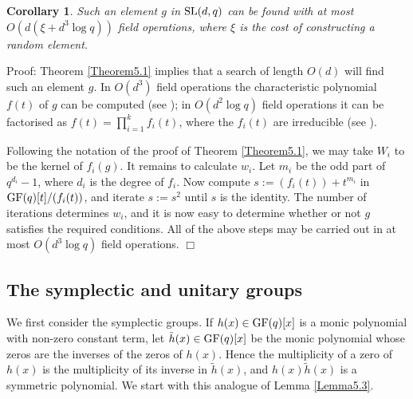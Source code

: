 \documentclass[12pt]{article}
\newtheorem{corollary}[definition]{Corollary}
\newenvironment{proof}{\normalsize {\sc Proof}:}{{\hfill $\Box$ \\}}
\def\SL{{\rm SL}}
\def\GF{{\rm GF}}
\begin{document}
\begin{corollary}\label{Corollary5.1} Such an element $g$ in $\SL(d,q)$ 
can be found with at most $O(d(\xi + d^3\log q))$ field operations,
where $\xi$ is the cost of constructing a random element.
\end{corollary}
\begin{proof}
Theorem \ref{Theorem5.1} implies that a search of length $O(d)$ 
will find such an element $g$. 
In $O(d^3)$ field operations 
the characteristic polynomial $f(t)$ of $g$ can be
computed (see \cite[Section 7.2]{HoltEickOBrien05}); 
in $O(d^2 \log q)$ field operations it can be factorised as 
$f(t)=\prod_{i=1}^kf_i(t)$, where the $f_i(t)$ are irreducible 
(see \cite[Theorem 14.14]{vzg}).

Following the notation of the proof of Theorem \ref{Theorem5.1},  
we may take $W_i$ to be the
kernel of $f_i(g)$. It remains to calculate $w_i$. Let $m_i$ be the
odd part of $q^{d_i}-1$, where $d_i$ is the degree of $f_i$. Now
compute $s :=(f_i(t))+t^{m_i}$ in $\GF(q)[t]/(f_i(t))$, and iterate 
$s := s^2$  until $s$ is the identity. The number of iterations
determines $w_i$, and it is now easy to determine whether or not $g$
satisfies the required conditions. All of the above steps may be carried
out in at most $O(d^3 \log q)$ field operations. 
\end{proof}


\subsection{The symplectic and unitary groups}
We first consider the symplectic groups.
If $h(x)\in\GF(q)[x]$ is a
monic polynomial with non-zero constant term, let
$\tilde{h}(x)\in\GF(q)[x]$ be the monic polynomial  whose zeros are the
inverses of the zeros of $h(x)$. Hence the multiplicity of a zero of
$h(x)$ is the multiplicity of its inverse in $\tilde{h}(x)$, and 
$h(x)\tilde{h}(x)$ is a symmetric  polynomial.  We start with this
analogue of Lemma \ref{Lemma5.3}.
\end{document}
